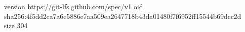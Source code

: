 version https://git-lfs.github.com/spec/v1
oid sha256:4f5dd2ca7a6e5886e7aa509ea2647718b43da01480f7f6952ff15544b69dcc2d
size 304
